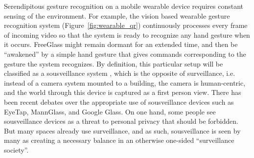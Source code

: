 Serendipitous gesture recognition on a mobile wearable device requires
constant sensing of the environment. For example, the vision based
wearable gesture recognition system (Figure~\ref{fig:wearable_qr})
continuously processes
every frame of incoming video so that the system is ready to recognize any
hand gesture when it occurs.  FreeGlass might remain dormant for an
extended time, and then be ``awakened'' by a simple hand gesture that
gives commands corresponding to the
gesture the system recognizes.
By definition, this particular setup will be
classified as a sousveillance system \cite{mann2004sousveillance,mann2006cyborglogging,mann2002sousveillance}, which is the opposite of
surveillance, i.e. instead of a camera system mounted to a building,
the camera is human-centric, and the world through this device is
captured as a first person view.  There has been recent
debates over the appropriate use of sousveillance devices
such as EyeTap, MannGlass, and Google Glass. On one hand, some people see
sousveillance devices as a threat to personal privacy that should
be forbidden.  But many spaces already use surveillance, and as such,
sousveillance is seen by many as creating a necessary balance in an otherwise
one-sided ``surveillance society''.

